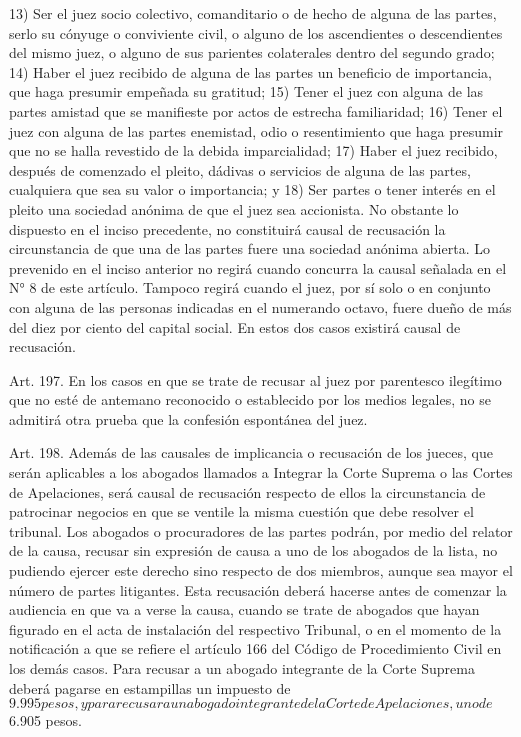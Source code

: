     13) Ser el juez socio colectivo, comanditario o de hecho de alguna de las partes, serlo su cónyuge o conviviente civil, o alguno de los ascendientes o descendientes del mismo juez, o alguno de sus parientes colaterales dentro del segundo grado;
    14) Haber el juez recibido de alguna de las partes un beneficio de importancia, que haga presumir empeñada su gratitud;
    15) Tener el juez con alguna de las partes amistad que se manifieste por actos de estrecha familiaridad;
    16) Tener el juez con alguna de las partes enemistad, odio o resentimiento que haga presumir que no se halla revestido de la debida imparcialidad;
    17) Haber el juez recibido, después de comenzado el pleito, dádivas o servicios de alguna de las partes, cualquiera que sea su valor o importancia; y
    18) Ser partes o tener interés en el pleito una sociedad anónima de que el juez sea accionista.
    No obstante lo dispuesto en el inciso precedente, no constituirá causal de recusación la circunstancia de que una de las partes fuere una sociedad anónima abierta.
    Lo prevenido en el inciso anterior no regirá cuando concurra la causal señalada en el N° 8 de este artículo. Tampoco regirá cuando el juez, por sí solo o en conjunto con alguna de las personas indicadas en el numerando octavo, fuere dueño de más del diez por ciento del capital social. En estos dos casos existirá causal de recusación.



    Art. 197. En los casos en que se trate de recusar al juez por parentesco ilegítimo que no esté de antemano reconocido o establecido por los medios legales, no se admitirá otra prueba que la confesión espontánea del juez.

    Art. 198. Además de las causales de implicancia o recusación de los jueces, que serán aplicables a los abogados llamados a Integrar la Corte Suprema o las Cortes de Apelaciones, será causal de recusación respecto de ellos la circunstancia de patrocinar negocios en que se ventile la misma cuestión que debe resolver el tribunal.
    Los abogados o procuradores de las partes podrán, por medio del relator de la causa, recusar sin expresión de causa a uno de los abogados de la lista, no pudiendo ejercer este derecho sino respecto de dos miembros, aunque sea mayor el número de partes litigantes. Esta recusación deberá hacerse antes de comenzar la audiencia en que va a verse la causa, cuando se trate de abogados que hayan figurado en el acta de instalación del respectivo Tribunal, o en el momento de la notificación a que se refiere el artículo 166 del Código de Procedimiento Civil en los demás casos.
    Para recusar a un abogado integrante de la Corte Suprema deberá pagarse en estampillas un impuesto de $9.995 pesos, y para recusar a un abogado integrante de la Corte de Apelaciones, uno de $6.905 pesos.








